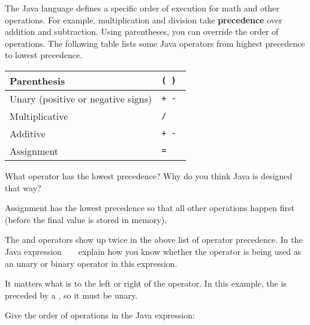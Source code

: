 

The Java language defines a specific order of execution for math and other operations. For example, multiplication and division take \textbf{precedence} over addition and subtraction. Using parentheses, you can override the order of operations.
The following table lists some Java operators from highest precedence to lowest precedence.

\begin{center}
\renewcommand{\arraystretch}{1.5}
\begin{tabular}{|L{3in}|L{1in}|}
\hline
Parenthesis
& \tt ( ) \\
\hline
Unary (positive or negative signs)
& \tt + - \\
\hline
Multiplicative
& \tt * / \\
\hline
Additive
& \tt + - \\
\hline
Assignment
& \tt = \\
\hline
\end{tabular}
\end{center}

%




\Q What operator has the lowest precedence?
Why do you think Java is designed that way?

\begin{answer}
Assignment has the lowest precedence so that all other operations happen first (before the final value is stored in memory).
\end{answer}


\Q The \java{+} and \java{-} operators show up twice in the above list of operator precedence.
In the Java expression ~  ~ explain how you know whether the \java{-} operator is being used as an unary or binary operator in this expression.

\begin{answer}
It matters what is to the left or right of the operator.
In this example, the \java{-} is preceded by a \java{*}, so it must be unary.
\end{answer}


\Q Give the order of operations in the Java expression: ~ 

